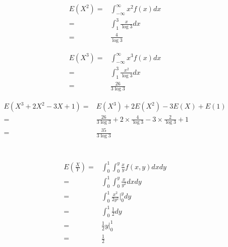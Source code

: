 \documentclass{article}
\begin{document}
                \begin{equation*}
                    \begin{split}
                        E(X^2)=&\int _{-\infty} ^\infty x^2f(x) dx\\
                            =&\int _1 ^3 \frac{x}{\log 3} dx\\
                            =&\frac{4}{\log 3}
                    \end{split}
                \end{equation*}

                \begin{equation*}
                    \begin{split}
                        E(X^3)=&\int _{-\infty} ^\infty x^3f(x) dx\\
                            =&\int _1 ^3 \frac{x^2}{\log 3} dx\\
                            =&\frac{26}{3\log 3}
                    \end{split}
                \end{equation*}

                \begin{equation*}
                    \begin{split}
                        E(X^3+2X^2-3X+1)=&E(X^3)+2E(X^2)-3E(X)+E(1)\\
                            =&\frac{26}{3\log 3}+2\times \frac{4}{\log 3} -3\times \frac{2}{\log 3}+1\\
                            =&\frac{35}{3\log3}
                    \end{split}
                \end{equation*}

    \section{}
        \begin{equation*}
            \begin{split}
                E(\frac{X}{Y})=&\int _0 ^1 \int _0 ^y \frac{x}{y}f(x,y) dx dy\\
                    =&\int _0 ^1 \int _0 ^y \frac{x}{y^2} dx dy\\
                    =&\int _0 ^1 \frac{x^2}{2y^2}|_0 ^y dy \\
                    =&\int _0 ^1 \frac{1}{2} dy\\
                    =& \frac{1}{2} y | _0 ^1 \\
                    =& \frac{1}{2} 
            \end{split}
        \end{equation*}
            
\end{document}
